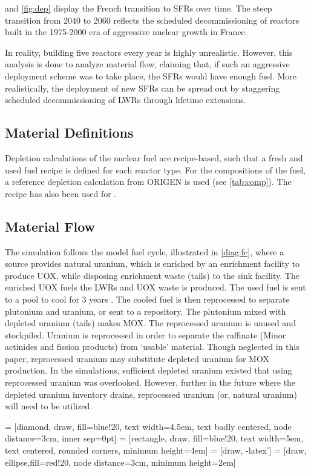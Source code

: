  and \cref{fig:dep} display
the French transition to \glspl{SFR} over time.
The steep transition from 2040 to 2060 reflects the scheduled
decommissioning of reactors built in the 1975-2000
era of aggressive nuclear growth in France.

In reality, building five reactors every year is highly unrealistic. However,
this analysis is done to analyze material flow, claiming that, if such an aggressive
deployment scheme was to take place, the \glspl{SFR} would have enough fuel.
More realistically, the deployment of new \glspl{SFR} can be spread out by
staggering scheduled decommissioning of \glspl{LWR} through lifetime extensions.

\subsection{Material Definitions}
Depletion calculations of the nuclear fuel are recipe-based, such that a fresh 
and used fuel recipe is defined for each reactor type.
For the compositions of the fuel, a reference depletion calculation
from ORIGEN is used (see \cref{tab:comp}). The recipe has also been used for
\cite{wilson_adoption_2009}.


\subsection{Material Flow}
The simulation follows the model fuel cycle, illustrated in \cref{diag:fc},
where a source provides natural uranium, which is enriched by an enrichment
facility to produce \gls{UOX}, while disposing enrichment waste (tails)
to the sink facility. The enriched \gls{UOX} fuels
the \gls{LWR}s and \gls{UOX} waste is produced. The used fuel
is sent to a pool to cool for 3 years \cite{carre_overview_2009}.
The cooled fuel is then reprocessed to separate plutonium and uranium,
or sent to a repository.
The plutonium mixed with depleted uranium (tails) makes \gls{MOX}.
The reprocessed uranium is unused and stockpiled. Uranium is reprocessed
in order to separate the raffinate (Minor actinides and fission products)
from `usable' material. Though neglected in this paper, reprocessed
uranium may substitute depleted uranium for \gls{MOX} production. In the
simulations, sufficient depleted uranium existed that using reprocessed
uranium was overlooked. However, further in the future where the depleted
uranium inventory drains, reprocessed uranium (or, natural uranium) will need to be utilized. 


 = [diamond, draw, fill=blue!20, 
text width=4.5em, text badly centered, node distance=3cm, inner sep=0pt]
 = [rectangle, draw, fill=blue!20, 
text width=5em, text centered, rounded corners, minimum height=4em]
 = [draw, -latex']
 = [draw, ellipse,fill=red!20, node distance=3cm,
minimum height=2em]


